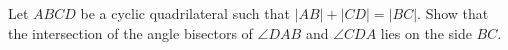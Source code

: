 Let $ABCD$ be a cyclic quadrilateral such that $|AB|+|CD|=|BC|$.
Show that the intersection of the angle
bisectors of $\angle DAB$ and $\angle CDA$ lies on the side $BC$.